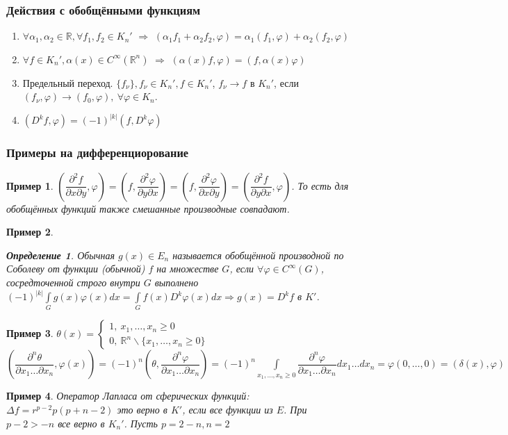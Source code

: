 \documentclass[9pt, a4paper]{article}
\newtheorem*{definition}{Определение}
\newtheorem*{sample}{Пример}
\begin{document}
		\subsubsection*{Действия с обобщёнными функциям}
			\begin{enumerate}
				\item $\forall \alpha_1, \alpha_2 \in \mathbb{R}, \forall f_1, f_2 \in K_n'$ $\Rightarrow$ $(\alpha_1 f_1 + \alpha_2 f_2, \varphi) = \alpha_1(f_1, \varphi) + \alpha_2(f_2, \varphi)$
				\item $\forall f \in K_n', \alpha(x) \in C^\infty(\mathbb{R}^n)$ $\Rightarrow$ $(\alpha(x)f, \varphi) = (f, \alpha(x) \varphi)$
				\item Предельный переход. $\{f_\nu\}, f_\nu \in K_n', f \in K_n'$, $f_\nu \to f$ в $K_n'$, если $(f_\nu, \varphi) \to (f_0, \varphi), \ \forall \varphi \in K_n$. 
				\item $(D^kf, \varphi) = (-1)^{|k|} (f, D^k\varphi)$
			\end{enumerate}
		\subsubsection*{Примеры на дифференциорование}
			\begin{sample}
				$(\dfrac{\partial^2f}{\partial x \partial y}, \varphi) = (f,\dfrac{\partial^2\varphi}{\partial y \partial x})= (f,\dfrac{\partial^2\varphi}{\partial x \partial y}) = (\dfrac{\partial^2f}{\partial y \partial x}, \varphi)$. То есть для обобщённых функций также смешанные производные совпадают.
			\end{sample}
			\begin{sample}
				\begin{definition}
					Обычная $g(x) \in E_n$ называется обобщённой производной по Соболеву от функции (обычной) $f$ на множестве $G$, если $\forall \varphi \in C^\infty(G)$, сосредточенной строго внутри $G$ выполнено $(-1)^{|k|} \int\limits_G g(x)\varphi(x) dx = \int\limits_G f(x) D^k \varphi(x) dx \Rightarrow g(x) = D^k f$ в $K'$.
				\end{definition}
			\end{sample}
			\begin{sample}
				$\theta(x) = \begin{cases}
					1, \ x_1, \dots, x_n \geq 0 \\
					0, \ \mathbb{R}^n \backslash \{x_1, \dots, x_n \geq 0\}
				\end{cases}$\newline
				$(\dfrac{\partial^n \theta}{\partial x_1 \dots \partial x_n}, \varphi(x)) = (-1)^n (\theta, \dfrac{\partial^n \varphi}{\partial x_1 \dots \partial x_n}) = (-1)^n \int\limits_{x_1, \dots, x_n \geq 0} \dfrac{\partial^n \varphi}{\partial x_1 \dots \partial x_n} dx_1 \dots dx_n = \varphi(0,\dots, 0) = (\delta(x), \varphi)$
			\end{sample}
			\begin{sample}
				Оператор Лапласа от сферических функций: \newline
				$\Delta f = r^{p-2} p(p+n-2)$ это верно в $K'$, если все функции из $E$.\newline
				При $p-2 > -n$ все верно в $K_n'$. Пусть $p= 2-n, n=2$
			\end{sample}
\end{document}
